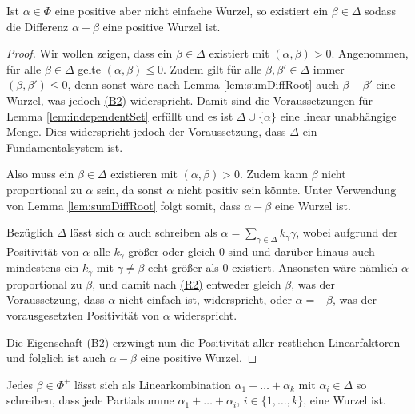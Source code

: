 \begin{lem}
  \label{lem:posRootNewRoot}
  Ist $\alpha \in \Phi$ eine positive aber nicht einfache Wurzel, so existiert ein $\beta \in \Delta$ sodass die Differenz $\alpha - \beta$ eine positive Wurzel ist.
\end{lem}

\begin{proof}
  Wir wollen zeigen, dass ein $\beta \in \Delta$ existiert mit $(\alpha, \beta) > 0$.
  Angenommen, für alle $\beta \in \Delta$ gelte $(\alpha, \beta) \leq 0$.
  Zudem gilt für alle $\beta, \beta' \in \Delta$ immer $(\beta, \beta') \leq 0$, denn sonst wäre nach Lemma \ref{lem:sumDiffRoot} auch $\beta - \beta'$ eine Wurzel, was jedoch \hyperref[it:B2]{(B2)} widerspricht.
  Damit sind die Voraussetzungen für Lemma \ref{lem:independentSet} erfüllt und es ist $\Delta \cup \{\alpha\}$ eine linear unabhängige Menge.
  Dies widerspricht jedoch der Voraussetzung, dass $\Delta$ ein Fundamentalsystem ist.

  Also muss ein $\beta \in \Delta$ existieren mit $(\alpha, \beta) > 0$.
  Zudem kann $\beta$ nicht proportional zu $\alpha$ sein, da sonst $\alpha$ nicht positiv sein könnte.
  Unter Verwendung von Lemma \ref{lem:sumDiffRoot} folgt somit, dass $\alpha - \beta$ eine Wurzel ist.
  
  Bezüglich $\Delta$ lässt sich $\alpha$ auch schreiben als $\alpha = \sum_{\gamma \in \Delta} k_\gamma \gamma$, wobei aufgrund der Positivität von $\alpha$ alle $k_\gamma$ größer oder gleich $0$ sind und darüber hinaus auch mindestens ein $k_\gamma$ mit $\gamma \neq \beta$ echt größer als $0$ existiert.
  Ansonsten wäre nämlich $\alpha$ proportional zu $\beta$, und damit nach \hyperref[it:R2]{(R2)} entweder gleich $\beta$, was der Voraussetzung, dass $\alpha$ nicht einfach ist, widerspricht, oder $\alpha = -\beta$, was der vorausgesetzten Positivität von $\alpha$ widerspricht.

  Die Eigenschaft \hyperref[it:B2]{(B2)} erzwingt nun die Positivität aller restlichen Linearfaktoren und folglich ist auch $\alpha - \beta$ eine positive Wurzel.
\end{proof}
 
\begin{cor}
  Jedes $\beta \in \Phi^+$ lässt sich als Linearkombination $\alpha_1 + \dots + \alpha_k$ mit $\alpha_i \in \Delta$ so schreiben, dass jede Partialsumme $\alpha_1 + \dots + \alpha_i$, $i \in \{1,\dots,k\}$, eine Wurzel ist.
\end{cor}

